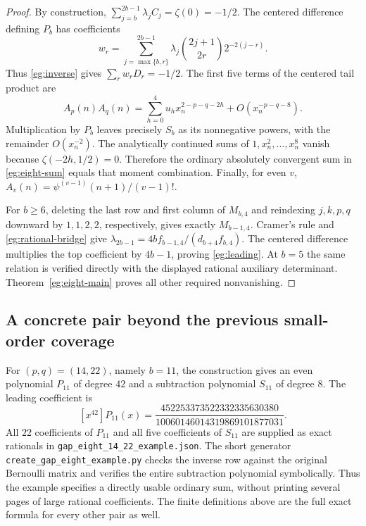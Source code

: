 \begin{proof}
By construction, $\sum_{j=b}^{2b-1}\lambda_j C_j=\zeta(0)=-1/2$.
The centered difference defining $P_b$ has coefficients
\[
 w_r=\sum_{j=\max\{b,r\}}^{2b-1}
       \lambda_j\binom{2j+1}{2r}2^{-2(j-r)}.
\]
Thus \eqref{eg:inverse} gives $\sum_rw_rD_r=-1/2$.
The first five terms of the centered tail product are
\[
 A_p(n)A_q(n)=\sum_{h=0}^4u_hx_n^{2-p-q-2h}
                      +O(x_n^{-p-q-8}).
\]
Multiplication by $P_b$ leaves precisely $S_b$ as its nonnegative
powers, with the remainder $O(x_n^{-2})$.  The analytically
continued sums of $1,x_n^2,\ldots,x_n^8$ vanish because
$\zeta(-2h,1/2)=0$.  Therefore the ordinary absolutely convergent
sum in \eqref{eg:eight-sum} equals that moment combination.
Finally, for even $v$,
$A_v(n)=\psi^{(v-1)}(n+1)/(v-1)!$.

For $b\ge6$, deleting the last row and first column of $M_{b,4}$
and reindexing $j,k,p,q$ downward by $1,1,2,2$, respectively,
gives exactly $M_{b-1,4}$.  Cramer's rule and
\eqref{eg:rational-bridge} give
$\lambda_{2b-1}=4b f_{b-1,4}/(d_{b+4}f_{b,4})$.
The centered difference multiplies the top coefficient by $4b-1$,
proving \eqref{eg:leading}.  At $b=5$ the same relation is
verified directly with the displayed rational auxiliary determinant.
Theorem~\ref{eg:eight-main} proves all other required nonvanishing.
\end{proof}


\subsection{A concrete pair beyond the previous small-order coverage}

For $(p,q)=(14,22)$, namely $b=11$, the construction gives an even
polynomial $P_{11}$ of degree $42$ and a subtraction polynomial
$S_{11}$ of degree $8$. The leading coefficient is
\[
 [x^{42}]P_{11}(x)=
 \frac{452253373522332335630380}{10060146014319869101877031}.
\]
All $22$ coefficients of $P_{11}$ and all five coefficients of
$S_{11}$ are supplied as exact rationals in
\texttt{gap\_eight\_14\_22\_example.json}.
The short generator \texttt{create\_gap\_eight\_example.py} checks
the inverse row against the original Bernoulli matrix and verifies
the entire subtraction polynomial symbolically. Thus the example
specifies a directly usable ordinary sum, without printing several
pages of large rational coefficients. The finite definitions above
are the full exact formula for every other pair as well.
